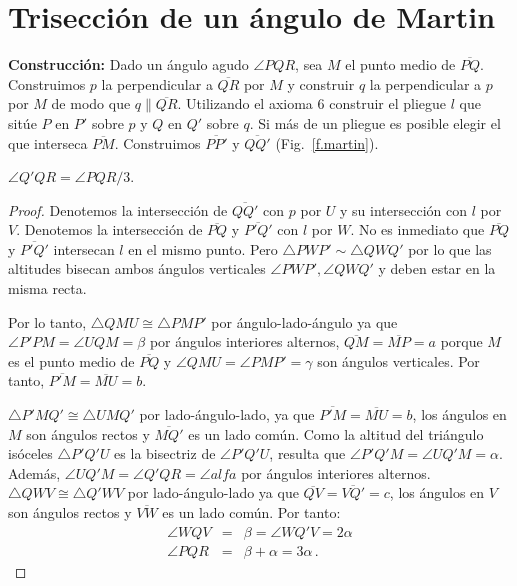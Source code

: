 \section{Trisección de un ángulo de Martin}\label{s.martin-trisection}

\noindent\textbf{Construcción:}
Dado un ángulo agudo $\angle PQR$, sea $M$ el punto medio de $\overline{PQ}$. Construimos $p$ la perpendicular a $\overline{QR}$ por $M$ y construir $q$ la perpendicular a $p$ por $M$ de modo que $q\parallel\overline{QR}$. Utilizando el axioma 6 construir el pliegue $l$ que sitúe $P$ en $P'$ sobre $p$ y $Q$ en $Q'$ sobre $q$. Si más de un pliegue es posible elegir el que interseca $\overline{PM}$. Construimos $\overline{PP'}$ y $\overline{QQ'}$  (Fig.~\ref{f.martin}).

\begin{theorem}
$\angle Q'QR=\angle PQR/3$.
\end{theorem}
\begin{proof}
Denotemos la intersección de $\overline{QQ'}$ con $p$ por $U$ y su intersección con $l$ por $V$. Denotemos la intersección de $\overline{PQ}$ y $\overline{P'Q'}$ con $l$ por $W$. No es inmediato que $\overline{PQ}$ y $\overline{P'Q'}$ intersecan $l$ en el mismo punto. Pero $\triangle PWP' \sim \triangle QWQ'$ por lo que las altitudes bisecan ambos ángulos verticales $\angle PWP', \angle QWQ'$ y deben estar en la misma recta.

Por lo tanto, $\triangle QMU\cong \triangle PMP'$ por ángulo-lado-ángulo ya que $\angle P'PM=\angle UQM=\beta$ por ángulos interiores alternos, $\overline{QM}=\overline{MP}=a$ porque $M$ es el punto medio de $\overline{PQ}$ y $\angle QMU=\angle PMP'=\gamma$ son ángulos verticales. Por tanto, $\overline{P'M}=\overline{MU}=b$.

$\triangle P'MQ'\cong \triangle UMQ'$ por lado-ángulo-lado, ya que $\overline{P'M}=\overline{MU}=b$, los ángulos en $M$ son ángulos rectos y $\overline{MQ'}$ es un lado común. Como la altitud del triángulo isóceles $\triangle P'Q'U$ es la bisectriz de $\angle P'Q'U$, resulta que $\angle P'Q'M=\angle UQ'M=\alpha$. Además, $\angle UQ'M=\angle Q'QR=\angle alfa$ por ángulos interiores alternos. $\triangle QWV\cong\triangle Q'WV$ por lado-ángulo-lado ya que $\overline{QV}=\overline{VQ'}=c$, los ángulos en $V$ son ángulos rectos y $\overline{VW}$ es un lado común. Por tanto:
\begin{eqnarray*}
\angle WQV&=&\beta=\angle WQ'V=2\alpha\\
\angle PQR &=& \beta + \alpha = 3\alpha\,.
\end{eqnarray*}
\end{proof}

